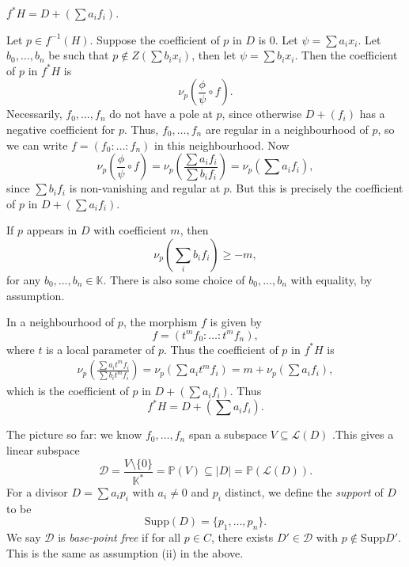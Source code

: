 \documentclass[12pt]{article}
\begin{document}
\begin{theorem}
	$f^\ast H = D + (\sum a_i f_i)$.
\end{theorem}


\begin{proofbox}
	Let $p \in f^{-1}(H)$. Suppose the coefficient of $p$ in $D$ is 0. Let $\psi = \sum a_i x_i$. Let $b_0, \ldots, b_n$ be such that $p \not \in Z(\sum b_i x_i)$, then let $\psi = \sum b_i x_i$. Then the coefficient of $p$ in $f^\ast H$ is
	\[
	\nu_p \left( \frac{\phi}{\psi} \circ f \right).
	\]
	Necessarily, $f_0, \ldots, f_n$ do not have a pole at $p$, since otherwise $D + (f_i)$ has a negative coefficient for $p$. Thus, $f_0, \ldots, f_n$ are regular in a neighbourhood of $p$, so we can write $f = (f_0: \ldots : f_n)$ in this neighbourhood. Now
	\[
	\nu_p \left( \frac{\phi}{\psi} \circ f \right) = \nu_p \left( \frac{\sum a_i f_i}{\sum b_i f_i} \right) = \nu_p \left( \sum a_i f_i \right),
	\]
	since $\sum b_i f_i$ is non-vanishing and regular at $p$. But this is precisely the coefficient of $p$ in $D + (\sum a_i f_i)$.

	If $p$ appears in $D$ with coefficient $m$, then
	\[
	\nu_p \left( \sum_i b_i f_i \right) \geq -m,
	\]
	for any $b_0, \ldots, b_n \in \mathbb{K}$. There is also some choice of $b_0, \ldots, b_n$ with equality, by assumption.

	In a neighbourhood of $p$, the morphism $f$ is given by
	\[
	f = (t^m f_0 : \ldots : t^m f_n),
	\]
	where $t$ is a local parameter of $p$. Thus the coefficient of $p$ in $f^\ast H$ is
	\begin{align*}
		\nu_p \left( \frac{\sum a_i t^m f_i}{\sum b_i t^m f_i} \right) = \nu_p \left( \sum a_i t^m f_i \right) = m + \nu_p \left( \sum a_i f_i \right),
	\end{align*}
	which is the coefficient of $p$ in $D + (\sum a_i f_i)$. Thus
	\[
	f^\ast H = D + \left( \sum a_i f_i \right).
	\]
\end{proofbox}

The picture so far: we know $f_0, \ldots, f_n$ span a subspace $V \subseteq \mathcal{L}(D)$ .This gives a linear subspace
\[
	\mathcal{D} = \frac{V \setminus \{0\}}{\mathbb{K}^\ast} = \mathbb{P}(V) \subseteq |D| = \mathbb{P}(\mathcal{L}(D)).
\]
For a divisor $D = \sum a_i p_i$ with $a_i \neq 0$ and $p_i$ distinct, we define the \emph{support} of $D$ to be
\[
	\mathrm{Supp}(D) = \{p_1, \ldots, p_n\}.
\]
We say $\mathcal{D}$ is \emph{base-point free} if for all $p \in C$, there exists $D' \in \mathcal{D}$ with $p \not \in \mathrm{Supp}D'$. This is the same as assumption (ii) in the above.
\end{document}
